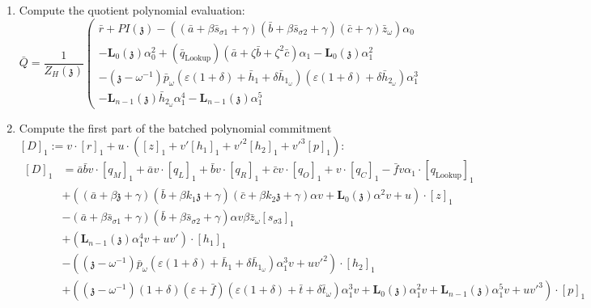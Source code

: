 \documentclass[fleqn]{article}
\begin{document}
\begin{enumerate}
				\item Compute the quotient polynomial evaluation:
					\[\bar{Q} =\frac{1}{Z_H(\mathfrak{z})}\left(\begin{array}{l}\bar{r} + PI(\mathfrak{z}) - ((\bar{a}+\beta\bar{s}_{\sigma 1}+\gamma)(\bar{b}+\beta\bar{s}_{\sigma 2}+\gamma)(\bar{c}+\gamma)\bar{z}_\omega)\alpha_0 \\ -\textbf{L}_0(\mathfrak{z})\alpha_0^2 + \left(\bar{q}_\text{Lookup}\right)(\bar{a}+\zeta \bar{b} + \zeta^2 \bar{c})\alpha_1 -\textbf{L}_0(\mathfrak{z})\alpha_1^2 \\ -(\mathfrak{z}-\omega^{-1})\bar{p}_\omega(\varepsilon(1+\delta)+\bar{h}_1+\delta \bar{h}_{1_\omega})(\varepsilon(1+\delta)+\delta \bar{h}_{2_\omega})\alpha_1^3 \\ -\textbf{L}_{n-1}(\mathfrak{z})\bar{h}_{2_\omega}\alpha_1^4-\textbf{L}_{n-1}(\mathfrak{z})\alpha_1^5 \end{array} \right.\]
	            
				\item Compute the first part of the batched polynomial commitment \\
					$\left[D\right]_1 := v\cdot[r]_1+u\cdot\left([z]_1 + v'[h_1]_1+v'^2[h_2]_1+v'^3[p]_1\right)$:
					\begin{align*}
					\left[D\right]_1 &= \bar{a}\bar{b}v\cdot[q_M]_1 + \bar{a}v\cdot[q_L]_1 + \bar{b}v\cdot[q_R]_1 + \bar{c}v\cdot[q_O]_1 + v\cdot[q_C]_1 -\bar{f}v\alpha_1\cdot[q_{\text{Lookup}}]_1 \\ 
					&+\left((\bar{a}+\beta\mathfrak{z}+\gamma)(\bar{b}+\beta k_1\mathfrak{z}+\gamma)(\bar{c}+\beta k_2 \mathfrak{z}+\gamma)\alpha v + \textbf{L}_0(\mathfrak{z})\alpha^2 v + u \right)\cdot[z]_1 \\ 
					&-(\bar{a}+\beta\bar{s}_{\sigma 1} + \gamma)(\bar{b}+\beta\bar{s}_{\sigma 2} + \gamma)\alpha v \beta \bar{z}_\omega[s_{\sigma 3}]_1 \\ 
					&+\left(\textbf{L}_{n-1}(\mathfrak{z})\alpha_1^4v+uv'\right)\cdot[h_1]_1 \\ 
					&-\left((\mathfrak{z}-\omega^{-1})\bar{p}_\omega(\varepsilon(1+\delta)+\bar{h}_1+\delta\bar{h}_{1_\omega})\alpha_1^3v + uv'^2\right)\cdot[h_2]_1 \\
					&+\left((\mathfrak{z}-\omega^{-1})(1+\delta)(\varepsilon+\bar{f})(\varepsilon(1+\delta)+\bar{t}+\delta\bar{t}_\omega)\alpha_1^3v + \textbf{L}_0(\mathfrak{z})\alpha_1^2v + \textbf{L}_{n-1}(\mathfrak{z})\alpha_1^5v +uv'^3\right)\cdot[p]_1
					\end{align*}
				

\end{enumerate}
\end{document}
